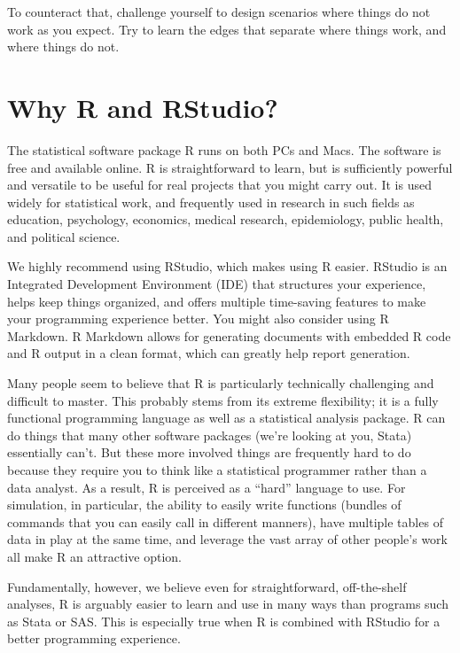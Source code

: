 \documentclass[
]{book}
\begin{document}
To counteract that, challenge yourself to design scenarios where things do not work as you expect.
Try to learn the edges that separate where things work, and where things do not.

\hypertarget{why-r-and-rstudio}{%
\section{Why R and RStudio?}\label{why-r-and-rstudio}}

The statistical software package R runs on both PCs and Macs. The software is free and available online.
R is straightforward to learn, but is sufficiently powerful and versatile to be useful for real projects that you might carry out.
It is used widely for statistical work, and frequently used in research in such fields as education, psychology, economics, medical research, epidemiology, public health, and political science.

We highly recommend using RStudio, which makes using R easier. RStudio is an Integrated Development Environment (IDE) that structures your experience, helps keep things organized, and offers multiple time-saving features to make your programming experience better. You might also consider using R Markdown. R Markdown allows for generating documents with embedded R code and R output in a clean format, which can greatly help report generation.

Many people seem to believe that R is particularly technically challenging and difficult to master. This probably stems from its extreme flexibility; it is a fully functional programming language as well as a statistical analysis package. R can do things that many other software packages (we're looking at you, Stata) essentially can't.
But these more involved things are frequently hard to do because they require you to think like a statistical programmer rather than a data analyst.
As a result, R is perceived as a ``hard'' language to use.
For simulation, in particular, the ability to easily write functions (bundles of commands that you can easily call in different manners), have multiple tables of data in play at the same time, and leverage the vast array of other people's work all make R an attractive option.

Fundamentally, however, we believe even for straightforward, off-the-shelf analyses, R is arguably easier to learn and use in many ways than programs such as Stata or SAS.
This is especially true when R is combined with RStudio for a better programming experience.
\end{document}
